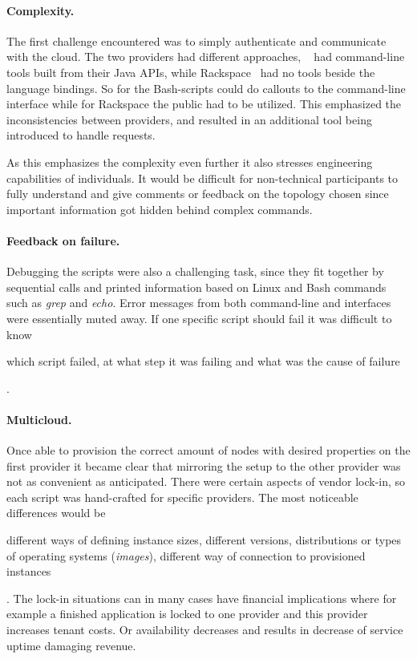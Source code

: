 \paragraph{Complexity.} 

The first challenge encountered was to simply 
authenticate and communicate with the cloud. 
The two providers had different approaches, ~\cite{aws} 
had command-line tools built from their Java APIs,
while Rackspace~\cite{rackspace} had no tools beside the  language bindings.
So for  the Bash-scripts could do callouts to the command-line interface 
while for Rackspace the public   had to be utilized.
This emphasized the inconsistencies between providers, 
and resulted in an additional tool being introduced to handle requests.

As this emphasizes the complexity even further it also stresses engineering 
capabilities of individuals.
It would be difficult for non-technical participants to fully understand and give comments
or feedback on the topology chosen since important information got hidden behind
complex commands.

\paragraph{Feedback on failure.}
Debugging the scripts were also a challenging task, since they fit together by
sequential calls and printed information based on Linux and Bash commands such as 
\emph{grep} and \emph{echo}.
Error messages from both command-line and  interfaces were essentially muted away.
If one specific script should fail it was difficult to know 
\begin{ii}
  \iitem which script failed, 
  \iitem at what step it was failing and 
  \iitem what was the cause of failure
\end{ii}.

\paragraph{Multicloud.}

Once able to provision the correct amount of nodes with desired properties
on the first provider it became clear that mirroring the setup to the other provider 
was not as convenient as anticipated.
There were certain aspects of vendor lock-in, so each script was hand-crafted for specific providers.
The most noticeable differences would be
\begin{ii}
  \iitem different ways of defining instance sizes,
  \iitem different versions, distributions or types of operating systems (\emph{images}),
  \iitem different way of connection to provisioned instances
\end{ii}.
The lock-in situations can in many cases have financial implications where for example
a finished application is locked to one provider and this provider increases tenant costs.
Or availability decreases and results in decrease of service uptime damaging revenue.

